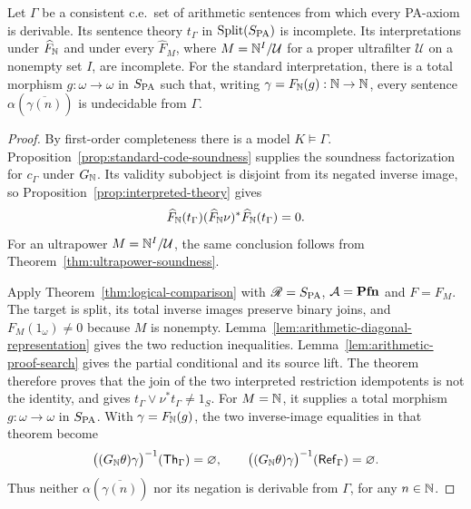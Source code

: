 \begin{theorem}
\label{thm:arithmetic-internal-comparison}
Let $\Gamma$ be a consistent c.e.\ set of arithmetic sentences
from which every PA-axiom is derivable. Its sentence theory
$t_\Gamma$ in $\operatorname{Split}(S_{\mathrm{PA}})$ is incomplete.
Its interpretations under $\widehat F_{\mathbb N}$ and under every
$\widehat F_M$, where $M=\mathbb N^I/\mathcal U$ for a proper ultrafilter
$\mathcal U$ on a nonempty set $I$, are incomplete.
For the standard interpretation, there is a total morphism
$g:\omega\to\omega$ in $S_{\mathrm{PA}}$ such that, writing
$\gamma=F_{\mathbb N}(g):\mathbb N\to\mathbb N$, every sentence
$\alpha(\overline{\gamma(n)})$ is undecidable from $\Gamma$.
\end{theorem}
\begin{proof}
By first-order completeness there is a model $K\models\Gamma$.
Proposition~\ref{prop:standard-code-soundness} supplies the
soundness factorization for $c_\Gamma$ under $G_{\mathbb N}$.
Its validity subobject is disjoint from its negated inverse
image, so Proposition~\ref{prop:interpreted-theory} gives
\[
 \widehat F_{\mathbb N}(t_\Gamma)
    (\widehat F_{\mathbb N}\nu)^*\widehat F_{\mathbb N}(t_\Gamma)=0.
\]
For an ultrapower $M=\mathbb N^I/\mathcal U$, the same conclusion
follows from Theorem~\ref{thm:ultrapower-soundness}.

Apply Theorem~\ref{thm:logical-comparison} with
$\mathscr R=S_{\mathrm{PA}}$, $\mathcal A=\mathbf{Pfn}$ and $F=F_M$.
The target is split, its total inverse images preserve binary
joins, and $F_M(1_\omega)\ne0$ because $M$ is nonempty.
Lemma~\ref{lem:arithmetic-diagonal-representation} gives the
two reduction inequalities. Lemma~\ref{lem:arithmetic-proof-search}
gives the partial conditional and its source lift.
The theorem therefore proves that the join of the two interpreted
restriction idempotents is not the identity, and gives
$t_\Gamma\vee\nu^*t_\Gamma\ne1_S$.
For $M=\mathbb N$, it supplies a total morphism $g:\omega\to\omega$
in $S_{\mathrm{PA}}$. With $\gamma=F_{\mathbb N}(g)$, the two inverse-image
equalities in that theorem become
\[
 \bigl((G_{\mathbb N}\theta)\gamma\bigr)^{-1}(\mathsf{Th}_\Gamma)
 =\varnothing,
 \qquad
 \bigl((G_{\mathbb N}\theta)\gamma\bigr)^{-1}(\mathsf{Ref}_\Gamma)
 =\varnothing.
\]
Thus neither $\alpha(\overline{\gamma(n)})$ nor its negation
is derivable from $\Gamma$, for any $n\in\mathbb N$.
\end{proof}

